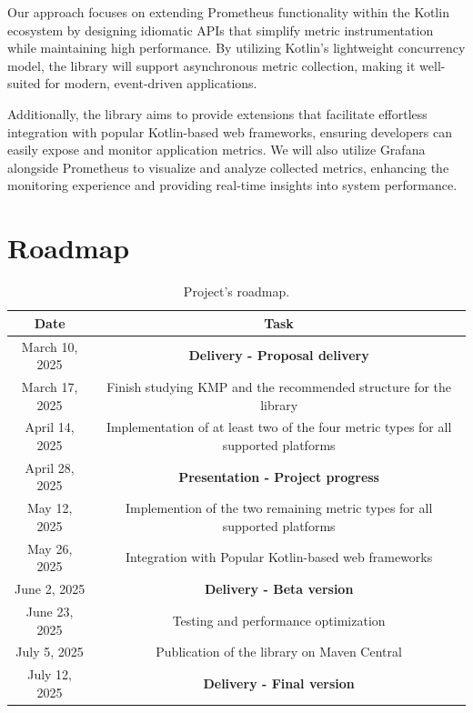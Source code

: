 \documentclass[a4paper,twoside,11pt]{article}
\begin{document}
Our approach focuses on extending Prometheus functionality within the Kotlin ecosystem by designing idiomatic APIs that simplify metric instrumentation while maintaining high performance. By utilizing Kotlin’s lightweight concurrency model, the library will support asynchronous metric collection, making it well-suited for modern, event-driven applications.

Additionally, the library aims to provide extensions that facilitate effortless integration with popular Kotlin-based web frameworks, ensuring developers can easily expose and monitor application metrics. We will also utilize Grafana alongside Prometheus to visualize and analyze collected metrics, enhancing the monitoring experience and providing real-time insights into system performance.

\section{Roadmap}
\begin{table}[h!]
\centering
\begin{tabular}{ |c||c|  }
  \hline
  Date &Task\\
  \hline
  March 10, 2025   & \textbf{Delivery - Proposal delivery}\\
  \hline
  March 17, 2025  & Finish studying KMP and the recommended structure for the library \\
  \hline
  April 14, 2025  &Implementation of at least two of the four metric types for all supported platforms\\
  \hline
  April 28, 2025&   \textbf{Presentation - Project progress}\\
  \hline
  May 12, 2025&   Implemention of the two remaining metric types for all supported platforms\\
  \hline
  May 26, 2025&   Integration with Popular Kotlin-based web frameworks\\
  \hline
  June 2, 2025 &\textbf{Delivery - Beta version}\\
  \hline
  June 23, 2025 &Testing and performance optimization\\
  \hline
  July 5, 2025 &Publication of the library on Maven Central\\
  \hline
  July 12, 2025    &\textbf{Delivery - Final version}\\
  \hline
 \end{tabular}
 \caption{Project's roadmap.}
 \label{table:2}
\end{table}



\end{document}
